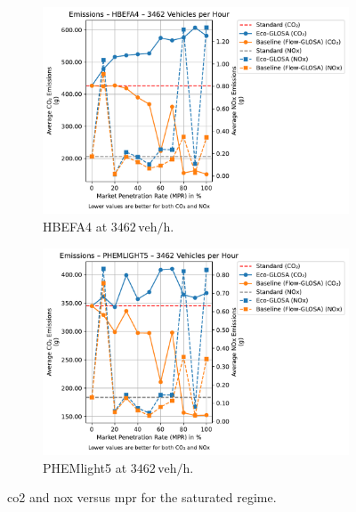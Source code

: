\begin{figure}[htb]
  \centering
  \begin{subfigure}[b]{0.45\textwidth}
    \includegraphics[width=\textwidth]{data/img/Emissions/Emissions_HBEFA4_Cars3462.pdf}
    \caption{HBEFA4 at $3462\,\mathrm{veh/h}$.}
    \label{fig:Emis_3462_HBEFA4}
  \end{subfigure}\hfill
  \begin{subfigure}[b]{0.45\textwidth}
    \includegraphics[width=\textwidth]{data/img/Emissions/Emissions_PHEMLIGHT5_Cars3462.pdf}
    \caption{PHEMlight5 at $3462\,\mathrm{veh/h}$.}
    \label{fig:Emis_3462_PHEM}
  \end{subfigure}
  \caption{\ac{co2} and \ac{nox} versus \ac{mpr} for the saturated regime.}
  \label{fig:Emis_3462}
\end{figure}

